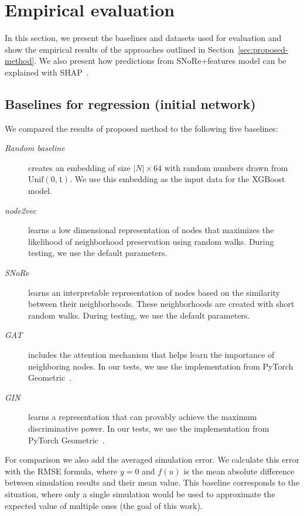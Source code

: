 \documentclass{article}
\begin{document}
\section{Empirical evaluation}\label{sec:empirical-eval}
In this section, we present the baselines and datasets used for evaluation and show the empirical results of the approaches outlined in Section~\ref{sec:proposed-method}. We also present how predictions from SNoRe+features model can be explained with  SHAP~\cite{lundberg2017shap}.

\subsection{Baselines for regression (initial network)}
\label{sec:baselines}
We compared the results of proposed method to the following five baselines:
\begin{description}
\item[\emph{Random baseline}] creates an embedding of size $|N|\times 64$ with random numbers drawn from $\textrm{Unif}(0,1)$. We use this embedding as the input data for the XGBoost model.
\item[\emph{node2vec}~\cite{grover2016node2vec}] learns a low dimensional representation of nodes that maximizes the likelihood of neighborhood preservation using random walks. During testing, we use the default parameters.
\item[\emph{SNoRe}~\cite{meznar2020snore}] learns an interpretable representation of nodes based on the similarity between their neighborhoods. These neighborhoods are created with short random walks. During testing, we use the default parameters.
\item[\emph{GAT}~\cite{velickovic2018graph}] includes the attention mechanism that helps learn the importance of neighboring nodes. In our tests, we use the implementation from PyTorch Geometric~\cite{Fey2019ptg}.
\item[\emph{GIN}~\cite{xu2018powerful}] learns a representation that can provably achieve the maximum discriminative power. In our tests, we use the implementation from PyTorch Geometric~\cite{Fey2019ptg}.
\end{description}

\noindent For comparison we also add the averaged simulation error. We calculate this error with the RMSE formula, where $y=0$ and $f(u)$ is the mean absolute difference between simulation results and their mean value. This baseline corresponds to the situation, where only a single simulation would be used to approximate the expected value of multiple ones (the goal of this work).
\end{document}
